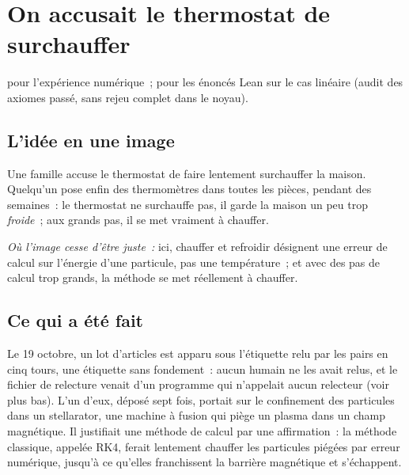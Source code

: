 \chapter[Le thermostat accusé]{On accusait le thermostat de surchauffer}

\noindent{} pour l'expérience numérique~;  pour les énoncés Lean sur le cas linéaire (audit des
axiomes passé, sans rejeu complet dans le noyau).

\section*{L'idée en une image}

\begin{analogie}
Une famille accuse le thermostat de faire lentement surchauffer la maison. Quelqu'un pose enfin des thermomètres
dans toutes les pièces, pendant des semaines~: le thermostat ne surchauffe pas, il garde la maison un peu trop
\emph{froide}~; aux grands pas, il se met vraiment à chauffer.

\emph{Où l'image cesse d'être juste~:} ici, \og chauffer\fg{} et \og refroidir\fg{} désignent une erreur de calcul
sur l'énergie d'une particule, pas une température~; et avec des pas de calcul trop grands, la méthode se met
réellement à chauffer.
\end{analogie}

\section*{Ce qui a été fait}

Le 19 octobre, un lot d'articles est apparu sous l'étiquette \og relu par les pairs en cinq tours\fg, une étiquette
sans fondement~: aucun humain ne les avait relus, et le fichier de relecture venait d'un programme qui n'appelait
aucun relecteur (voir plus bas). L'un d'eux, déposé sept fois, portait sur le confinement des particules dans un stellarator, une machine à fusion qui piège un
plasma dans un champ magnétique. Il justifiait une méthode de calcul par une affirmation~: la méthode classique,
appelée RK4, ferait lentement \og chauffer\fg{} les particules piégées par erreur numérique, jusqu'à ce qu'elles
franchissent la barrière magnétique et s'échappent.

